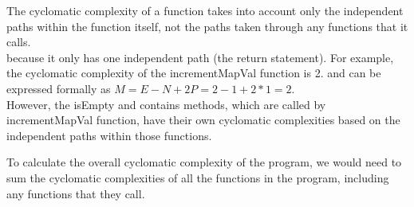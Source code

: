 \documentclass[a4paper]{article}
\begin{document}
\vspace{4mm}

  

The cyclomatic complexity of a function takes into account only the independent paths within the function itself, 
not the paths taken through any functions that it calls. \\

because it only has one independent path (the return statement). 
For example, the cyclomatic complexity of the incrementMapVal function is 2.
and can be expressed formally as
$M = E - N + 2P = 2 - 1 + 2 * 1 = 2$. \\

However, the isEmpty and contains methods, which are called by incrementMapVal function,
have their own cyclomatic complexities based on the independent paths within those functions. \\


\begin{figure}[h!]
\centering
{}
\end{figure}



To calculate the overall cyclomatic complexity of the program,
we would need to sum the cyclomatic complexities of all the functions in the program, 
including any functions that they call. \\
\end{document}
